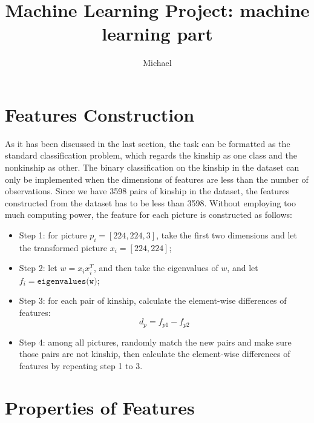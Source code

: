 \documentclass[12pt]{article}
\theoremstyle{definition}
\numberwithin{equation}{section}
\numberwithin{figure}{section}
\numberwithin{table}{section}
\begin{document}
\title{Machine Learning Project: machine learning part}
\author{Michael}
\date{}
\maketitle



\section{Features Construction}

As it has been discussed in the last section, the task can be formatted as the standard classification problem, which regards the kinship as one class and the nonkinship as other. The binary classification on the kinship in the dataset can only be implemented when the dimensions of features are less than the number of observations. Since we have 3598 pairs of kinship in the dataset, the features constructed from the dataset has to be less than 3598. Without employing too much computing power, the feature for each picture is constructed as follows:
\begin{itemize}
	\item Step 1: for picture $p_i = [224, 224, 3]$, take the first two dimensions and let the transformed picture $x_i = [224, 224]$;
	\item Step 2: let $w = x_ix_i^T$, and then take the eigenvalues of $w$, and let $f_i = \texttt{eigenvalues(w)}$;
	\item Step 3: for each pair of kinship, calculate the element-wise differences of features: $$d_p = f_{p1} - f_{p2}$$
	\item Step 4: among all pictures, randomly match the new pairs and make sure those pairs are not kinship, then calculate the element-wise differences of features by repeating step 1 to 3. 
\end{itemize}


\section{Properties of Features}
\end{document}
